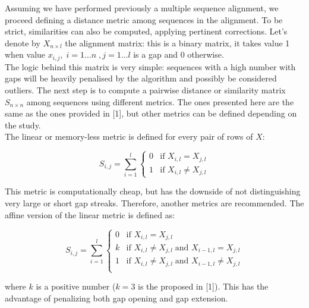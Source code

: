 \documentclass[a4paper]{llncs}
\begin{document}
Assuming we have performed previously a multiple sequence alignment, we proceed defining a distance metric among sequences in the alignment. To be strict, similarities can also be computed, applying pertinent corrections. Let's denote by $X_{n\times l}$ the alignment matrix: this is a binary matrix, it takes value 1 when value $x_{i,j}, \;i=1\dots n\;, j=1\dots l$ is a gap and $0$ otherwise.\\

The logic behind this matrix is very simple: sequences with a high number with gaps will be heavily penalised by the algorithm and possibly be considered outliers. The next step is to compute a pairwise distance or similarity matrix $S_{n\times n}$ among sequences using different metrics. The ones presented here are the same as the ones provided in [1], but other metrics can be defined depending on the study.  \\

The linear or memory-less metric is defined for every pair of rows of $X$:

\begin{equation}
S_{i,j}=\sum_{i=1}^l
\left\{
	\begin{array}{ll}
		0  & \mbox{if } X_{i,l} = X_{j,l} \\
		1 & \mbox{if } X_{i,l} \neq X_{j,l}
	\end{array}
\right.
\end{equation}

This metric is computationally cheap, but has the downside of not distinguishing very large or short gap streaks. Therefore, another metrics are recommended. The affine version of the linear metric is defined as:

\begin{equation}
S_{i,j} = \sum_{i=1}^l
\left\{
	\begin{array}{ll}
		0  & \mbox{if } X_{i,l} = X_{j,l} \\
		k & \mbox{if } X_{i,l} \neq X_{j,l} \;\mbox{and } X_{i-1,l} = X_{j,l}\\
		1 & \mbox{if } X_{i,l} \neq X_{j,l} \;\mbox{and } X_{i-1,l} \neq X_{j,l}\\		
	\end{array}
\right.
\end{equation}

where $k$ is a positive number ($k=3$ is the proposed in [1]). This has the advantage of penalizing both gap opening and gap extension.\\
\end{document}
